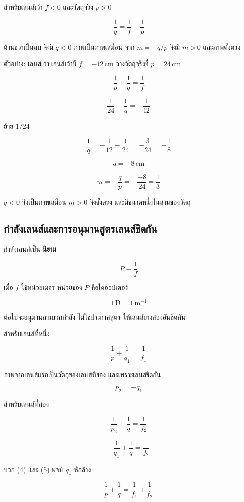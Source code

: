สำหรับเลนส์เว้า $f<0$ และวัตถุจริง $p>0$

\[
\frac{1}{q}=\frac{1}{f}-\frac{1}{p}
\]

ด้านขวาเป็นลบ จึงมี $q<0$ ภาพเป็นภาพเสมือน จาก $m=-q/p$ จึงมี $m>0$ และภาพตั้งตรง

\begin{examplebox}{ตัวอย่าง: เลนส์เว้า}
เลนส์เว้ามี $f=-12\,\mathrm{cm}$ วางวัตถุจริงที่ $p=24\,\mathrm{cm}$

\[
\frac{1}{p}+\frac{1}{q}=\frac{1}{f}
\]

\[
\frac{1}{24}+\frac{1}{q}=-\frac{1}{12}
\]

ย้าย $1/24$

\[
\frac{1}{q}
=-\frac{1}{12}-\frac{1}{24}
=-\frac{3}{24}
=-\frac{1}{8}
\]

\[
q=-8\,\mathrm{cm}
\]

\[
m=-\frac{q}{p}
=-\frac{-8}{24}
=\frac{1}{3}
\]

$q<0$ จึงเป็นภาพเสมือน $m>0$ จึงตั้งตรง และมีขนาดหนึ่งในสามของวัตถุ
\end{examplebox}

\subsection{กำลังเลนส์และการอนุมานสูตรเลนส์ชิดกัน}

กำลังเลนส์เป็น \textbf{นิยาม}

\begin{tcolorbox}[title={นิยาม: กำลังเลนส์}]
\[
\boxed{P\equiv\frac{1}{f}}
\]

เมื่อ $f$ ใช้หน่วยเมตร หน่วยของ $P$ คือไดออปเตอร์

\[
1\,\mathrm{D}=1\,\mathrm{m^{-1}}
\]
\end{tcolorbox}

ต่อไปจะอนุมานการบวกกำลัง ไม่ใช่ประกาศสูตร ให้เลนส์บางสองอันชิดกัน

สำหรับเลนส์ที่หนึ่ง

\[
\frac{1}{p}+\frac{1}{q_1}=\frac{1}{f_1}
\tag{4}
\]

ภาพจากเลนส์แรกเป็นวัตถุของเลนส์ที่สอง และเพราะเลนส์ชิดกัน

\[
p_2=-q_1
\]

สำหรับเลนส์ที่สอง

\[
\frac{1}{p_2}+\frac{1}{q}=\frac{1}{f_2}
\]

\[
-\frac{1}{q_1}+\frac{1}{q}=\frac{1}{f_2}
\tag{5}
\]

บวก (4) และ (5) พจน์ $q_1$ หักล้าง

\[
\frac{1}{p}+\frac{1}{q}
=
\frac{1}{f_1}+\frac{1}{f_2}
\]

